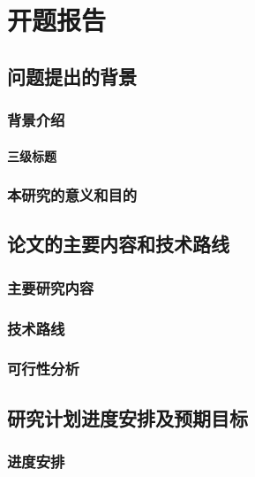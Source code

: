 \cleardoublepage


\section{开题报告}

\subsection{问题提出的背景}

\subsubsection{背景介绍}

\paragraph{三级标题}

\subsubsection{本研究的意义和目的}

\subsection{论文的主要内容和技术路线}

\subsubsection{主要研究内容}

\subsubsection{技术路线}

\subsubsection{可行性分析}

\subsection{研究计划进度安排及预期目标}

\subsubsection{进度安排}

